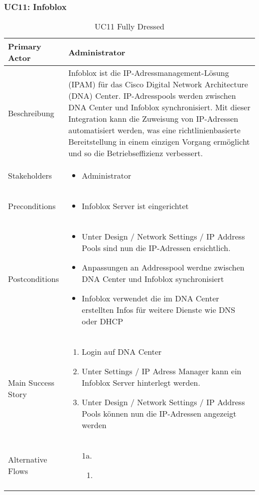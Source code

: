 \subsubsection{UC11: Infoblox}
\begin{table}[H]
	\centering
	\begin{tabularx}{\textwidth}{l | X}
		Primary Actor   & Administrator       \\
		\hline
		Beschreibung   & Infoblox ist die IP-Adressmanagement-Lösung (IPAM) für das Cisco Digital Network Architecture (DNA) Center. IP-Adresspools werden zwischen DNA Center und Infoblox synchronisiert. Mit dieser Integration kann die Zuweisung von IP-Adressen automatisiert werden, was eine richtlinienbasierte Bereitstellung in einem einzigen Vorgang ermöglicht und so die Betriebseffizienz verbessert.  \\ 
		\hline
		Stakeholders       & 
		\begin{itemize}
			\item Administrator
		\end{itemize} \\ 
		Preconditions      &
		\begin{itemize}	
			\item Infoblox Server ist eingerichtet
		\end{itemize}  \\
		\hline
		Postconditions     & 
		\begin{itemize}	
			\item Unter Design / Network Settings / IP Address Pools sind nun die IP-Adressen ersichtlich.
			\item Anpassungen an Addresspool werdne zwischen DNA Center und Infoblox synchronisiert
			\item Infoblox verwendet die im DNA Center erstellten Infos für weitere Dienste wie DNS oder DHCP
		\end{itemize}  \\
		\hline
		Main Success Story & 
		\begin{enumerate}
			\item Login auf DNA Center
			\item Unter Settings / IP Adress Manager kann ein Infoblox Server hinterlegt werden.
			\item Unter Design / Network Settings / IP Address Pools können nun die IP-Adressen angezeigt werden
		\end{enumerate}
		\\
		\hline
		Alternative Flows  & 
		\begin{itemize}
			\item[1a.]  
			\begin{enumerate}
				\item 
			\end{enumerate}
		\end{itemize}
	\end{tabularx}
	\caption{UC11 Fully Dressed}
	\label{tab:UC11}
\end{table}


